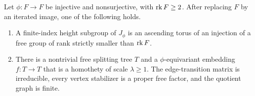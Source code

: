 \begin{lemma}\label{asc:relative-model}
Let $\phi:F\to F$ be injective and nonsurjective, with $\operatorname{rk} F\ge2$.
After replacing $F$ by an iterated image, one of the following holds.
\begin{enumerate}[label=\textup{(\roman*)}]
\item A finite-index height subgroup of $J_\phi$ is an ascending torus of
an injection of a free group of rank strictly smaller than $\operatorname{rk} F$.
\item There is a nontrivial free splitting tree $T$ and a
$\phi$-equivariant embedding $f:T\to T$ that is a homothety of scale
$\lambda\ge1$. The edge-transition matrix is irreducible, every vertex
stabilizer is a proper free factor, and the quotient graph is finite.
\end{enumerate}
\end{lemma}

